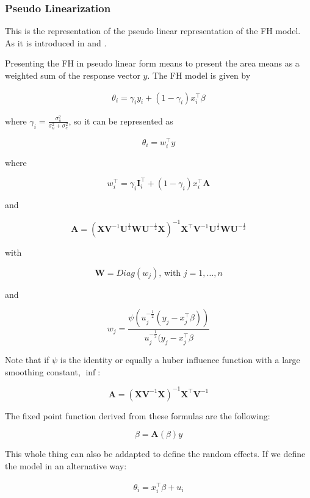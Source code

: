 \subsubsection{Pseudo Linearization}\label{pseudo-linearization}

This is the representation of the pseudo linear representation of the FH
model. As it is introduced in \textcite{Cha11} and \textcite{Cha14}.

Presenting the FH in pseudo linear form means to present the area means
as a weighted sum of the response vector $y$. The FH model is given by

\begin{align}
\theta_i = \gamma_i y_i + (1 - \gamma_i) x_i^\top \beta 
\end{align}

where $\gamma_i = \frac{\sigma^2_u}{\sigma^2_u + \sigma^2_e}$, so it can
be represented as

\[
\theta_i = w_i^\top y
\]

where

\[
w_i^\top = \gamma_i \mathbf{I}^\top_i + (1 - \gamma_i) x_i^\top \mathbf{A}
\]

and

\[
\mathbf{A} = \left(\mathbf{X} \mathbf{V}^{-1} \mathbf{U}^\frac{1}{2} \mathbf{W} \mathbf{U}^{-\frac{1}{2}} \mathbf{X} \right)^{-1} \mathbf{X}^\top \mathbf{V}^{-1} \mathbf{U}^\frac{1}{2} \mathbf{W} \mathbf{U}^{-\frac{1}{2}}
\]

with

\[
\mathbf{W} = Diag(w_j)\text{, with } j = 1, \dots, n
\]

and

\[
w_j = \frac{\psi\left( u_j^{-\frac{1}{2}} ( y_j - x_j^\top\beta ) \right)}{ u_j^{-\frac{1}{2}} ( y_j - x_j^\top\beta }
\]

Note that if $\psi$ is the identity or equally a huber influence
function with a large smoothing constant, \ie $\inf$:

\[
\mathbf{A} = \left(\mathbf{X} \mathbf{V}^{-1} \mathbf{X} \right)^{-1} \mathbf{X}^\top \mathbf{V}^{-1}
\]

The fixed point function derived from these formulas are the following:

\[
\beta = \mathbf{A}(\beta) y
\]

This whole thing can also be addapted to define the random effects. If
we define the model in an alternative way:

\begin{align}
\theta_i = x_i^\top \beta + u_i
\end{align}

